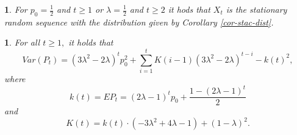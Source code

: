 \documentclass{amsart}
\theoremstyle{definition}
\theoremstyle{plain}
\newtheorem{prop}[thm]{\protect\propositionname}
\theoremstyle{plain}
\theoremstyle{plain}
\newtheorem{rem}[thm]{\protect\remarkname}
\numberwithin{equation}{section}
\providecommand{\propositionname}{Proposition}
\providecommand{\remarkname}{Remark}
\begin{document}
\begin{rem}
For $p_0=\frac{1}{2}$ and $t\ge1$ or $\lambda = \frac{1}{2}$ and $t\ge2$ it hods that $X_t$ is the stationary
random sequence with the distribution given by Corollary
\ref{cor-stac-dist}.
\end{rem}

\begin{prop}
\label{PropVarP-succes}For all $t\geq1,$ it holds that
\begin{equation}
Var(P_{t})=(3\lambda^{2}-2\lambda)^{t}p_{0}^{2}+\sum_{i=1}^{t}K(i-1)(3\lambda^{2}-2\lambda)^{t-i}-k(t)^{2},\label{eq:VarP-proposition}
\end{equation}
 where
\[
k(t)=EP_{t}=(2\lambda-1)^{t}p_{0}+\frac{1-(2\lambda-1)^{t}}{2}
\]
 and
\[
K(t)=k(t)\cdot(-3\lambda^{2}+4\lambda-1)+(1-\lambda)^{2}.
\]
\end{prop}
\end{document}
